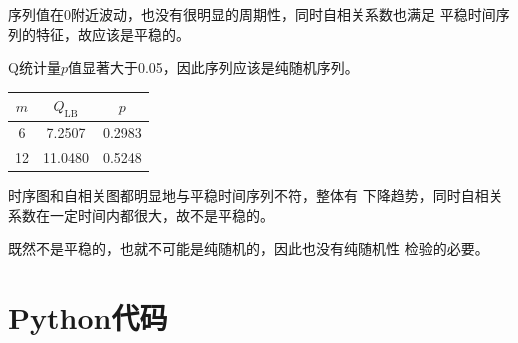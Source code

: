 \documentclass[cn]{homework}
\begin{document}
\begin{subproblem}
        \item
        序列值在0附近波动，也没有很明显的周期性，同时自相关系数也满足
        平稳时间序列的特征，故应该是平稳的。

        Q统计量$p$值显著大于0.05，因此序列应该是纯随机序列。
        \begin{margintable}
            \begin{tabular}{ccc}
                \toprule
                $m$ & $Q_{\mathrm{LB}}$ & $p$ \\
                \midrule
                6 & 7.2507 & 0.2983\\
                12 & 11.0480 & 0.5248\\
                \bottomrule
            \end{tabular}
        \end{margintable}
       

        \item
        时序图和自相关图都明显地与平稳时间序列不符，整体有
        下降趋势，同时自相关系数在一定时间内都很大，故不是平稳的。

        既然不是平稳的，也就不可能是纯随机的，因此也没有纯随机性
        检验的必要。

    \end{subproblem}

    \appendix
    \section{Python代码}
    
\end{document}
